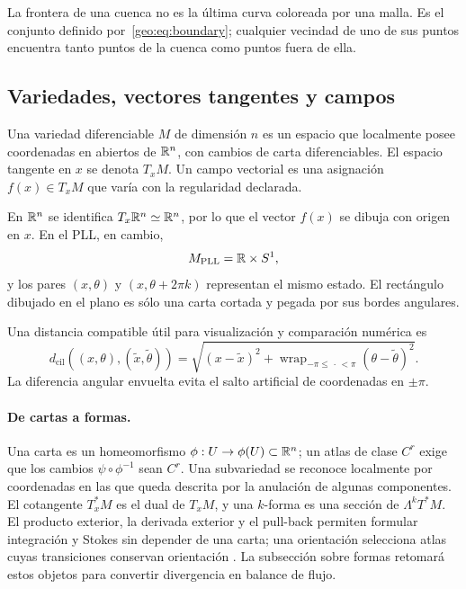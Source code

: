 La frontera de una cuenca no es la última curva coloreada por una malla. Es el
conjunto definido por~\eqref{geo:eq:boundary}; cualquier vecindad de uno de sus
puntos encuentra tanto puntos de la cuenca como puntos fuera de ella.

\subsection{Variedades, vectores tangentes y campos}

\begin{definition}
Una variedad diferenciable \(M\) de dimensión \(n\) es un espacio que
localmente posee coordenadas en abiertos de \(\mathbb{R}^n\), con cambios de carta
diferenciables. El espacio tangente en \(x\) se denota \(T_xM\). Un campo
vectorial es una asignación \(f(x)\in T_xM\) que varía con la regularidad
declarada.
\end{definition}

En \(\mathbb{R}^n\) se identifica \(T_x\mathbb{R}^n\simeq\mathbb{R}^n\), por lo que el vector
\(f(x)\) se dibuja con origen en \(x\). En el PLL, en cambio,
\begin{equation}
  M_{\mathrm{PLL}}=\mathbb{R}\times S^1,
  \label{geo:eq:pll-phase-space}
\end{equation}
y los pares \((x,\theta)\) y \((x,\theta+2\pi k)\) representan el mismo estado.
El rectángulo dibujado en el plano es sólo una carta cortada y pegada por sus
bordes angulares.

Una distancia compatible útil para visualización y comparación numérica es
\begin{equation}
 d_{\mathrm{cil}}((x,\theta),(\tilde x,\tilde\theta))
 =\sqrt{(x-\tilde x)^2+
 \operatorname{wrap}_{-\pi\le\,\cdot\,<\pi}(\theta-\tilde\theta)^2}.
 \label{geo:eq:cylindrical-distance}
\end{equation}
La diferencia angular envuelta evita el salto artificial de coordenadas en
\(\pm\pi\).

\paragraph{De cartas a formas.}
Una carta es un homeomorfismo \(\phi:U\to\phi(U)\subset\mathbb{R}^n\); un atlas de
clase \(C^r\) exige que los cambios \(\psi\circ\phi^{-1}\) sean \(C^r\). Una
subvariedad se reconoce localmente por coordenadas en las que queda descrita
por la anulación de algunas componentes. El cotangente \(T_x^*M\) es el dual
de \(T_xM\), y una \(k\)-forma es una sección de \(\Lambda^kT^*M\). El
producto exterior, la derivada exterior y el pull-back permiten formular
integración y Stokes sin depender de una carta; una orientación selecciona
atlas cuyas transiciones conservan orientación
\cite{NahmadAchar2022Topologia}. La subsección sobre formas retomará estos
objetos para convertir divergencia en balance de flujo.

